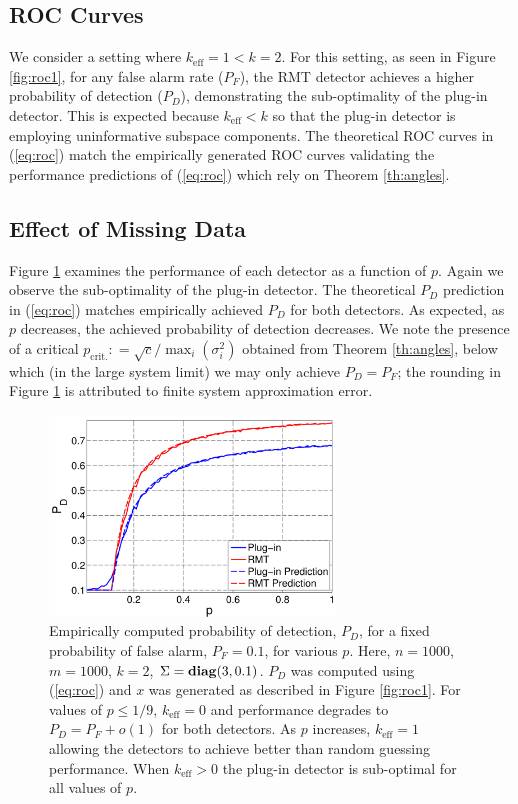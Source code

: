 \subsection{ROC Curves}

We consider a setting where $k_{\text{eff}} = 1 < k = 2$. For this setting, as seen in Figure \ref{fig:roc1}, for any false alarm rate ($P_F$), the RMT detector achieves a higher probability of detection ($P_D$), demonstrating the sub-optimality of the plug-in detector. This is expected because $k_\text{eff}<k$ so that the plug-in detector is employing uninformative subspace components. The theoretical ROC curves in (\ref{eq:roc}) match the empirically generated ROC curves validating the performance predictions of (\ref{eq:roc}) which rely on Theorem \ref{th:angles}.

\subsection{Effect of Missing Data}
Figure \ref{fig:sparsity} examines the performance of each detector as a function of $p$. Again we observe the sub-optimality of the plug-in detector. The theoretical $P_D$ prediction in (\ref{eq:roc}) matches empirically achieved $P_D$ for both detectors. As expected, as $p$ decreases, the achieved probability of detection decreases. We note the presence of a critical $p_{\text{crit.}} : = \sqrt{c}/\max_{i}(\sigma_{i}^{2})$ obtained from Theorem \ref{th:angles}, below which (in the large system limit) we may only achieve $P_D=P_F$; the rounding in Figure \ref{fig:sparsity} is attributed to finite system approximation error.

\begin{figure}[t]
\centering
\includegraphics[width=3in]{msd_missing/figures/sparsity.pdf}
\caption{Empirically computed probability of detection, $P_D$, for a fixed probability of false alarm, $P_F=0.1$, for various $p$. Here, $n=1000$, $m=1000$, $k=2$, $\Sigma=\mathop{\bf diag}(3,0.1)$. $P_D$ was computed using (\ref{eq:roc}) and $x$ was generated as described in Figure \ref{fig:roc1}. For values of $p \leq 1/9$, $k_\text{eff}=0$ and performance degrades to $P_D = P_F +o(1)$ for both detectors. As $p$ increases, $k_\text{eff}=1$ allowing the detectors to achieve better than random guessing performance. When $k_\text{eff}>0$ the plug-in detector is sub-optimal for all values of $p$.}\vskip-0.45cm
\label{fig:sparsity}
\end{figure}



